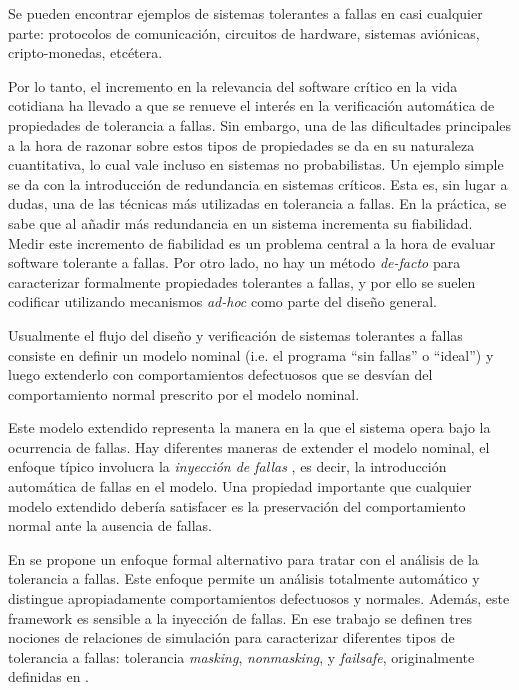 Se pueden encontrar ejemplos de sistemas tolerantes a fallas en casi cualquier parte: protocolos de comunicación, circuitos de hardware, sistemas aviónicas, cripto-monedas, etcétera.

Por lo tanto, el incremento en la relevancia del software crítico en la vida cotidiana ha llevado a que se renueve el interés en la verificación automática de propiedades de tolerancia a fallas. Sin embargo, una de las dificultades principales a la hora de razonar sobre estos tipos de propiedades se da en su naturaleza cuantitativa, lo cual vale incluso en sistemas no probabilistas.
Un ejemplo simple se da con la introducción de redundancia en sistemas críticos. Esta es, sin lugar a dudas, una de las técnicas más utilizadas en tolerancia a fallas.
En la práctica, se sabe que al añadir más redundancia en un sistema incrementa su fiabilidad. Medir este incremento de fiabilidad es un problema central a la hora de evaluar software tolerante a fallas. Por otro lado, no hay un método \emph{de-facto} para caracterizar formalmente propiedades tolerantes a fallas, y por ello se suelen codificar utilizando mecanismos \emph{ad-hoc} como parte del diseño general.

Usualmente el flujo del diseño y verificación de sistemas tolerantes a fallas consiste en definir un modelo nominal (i.e. el programa ``sin fallas'' o ``ideal'') y luego extenderlo con comportamientos defectuosos que se desvían del comportamiento normal prescrito por el modelo nominal.

Este modelo extendido representa la manera en la que el sistema opera bajo la ocurrencia de fallas.
Hay diferentes maneras de extender el modelo nominal, el enfoque típico involucra la \emph{inyección de fallas}  \cite{HsuehTI97,IyerNGK10}, es decir, la introducción automática de fallas en el modelo. Una propiedad importante que cualquier modelo extendido debería satisfacer es la preservación del comportamiento normal ante la ausencia de fallas.

En \cite{DemasiCMA17} se propone un enfoque formal alternativo para tratar con el análisis de la tolerancia a fallas. Este enfoque permite un análisis totalmente automático y distingue apropiadamente comportamientos defectuosos y normales. Además, este framework es sensible a la inyección de fallas. En ese trabajo se definen tres nociones de relaciones de simulación para caracterizar diferentes tipos de tolerancia a fallas:
tolerancia \emph{masking}, \emph{nonmasking}, y \emph{failsafe}, originalmente definidas en \cite{Gartner99}. 

